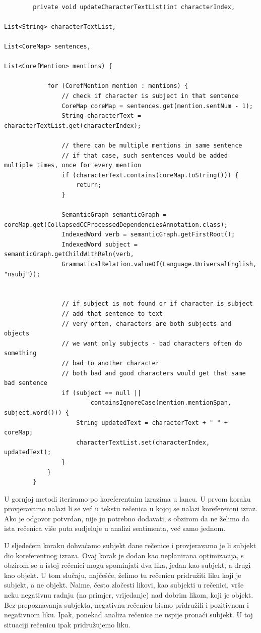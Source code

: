 \documentclass[a4paper,twoside,12pt]{memoir} %
\begin{document}
		\begin{lstlisting}

		private void updateCharacterTextList(int characterIndex,
																List<String> characterTextList,
																List<CoreMap> sentences,
																List<CorefMention> mentions) {

			for (CorefMention mention : mentions) {
				// check if character is subject in that sentence
				CoreMap coreMap = sentences.get(mention.sentNum - 1);
				String characterText = characterTextList.get(characterIndex);

				// there can be multiple mentions in same sentence
				// if that case, such sentences would be added multiple times, once for every mention
				if (characterText.contains(coreMap.toString())) {
					return;
				}

				SemanticGraph semanticGraph = coreMap.get(CollapsedCCProcessedDependenciesAnnotation.class);
				IndexedWord verb = semanticGraph.getFirstRoot();
				IndexedWord subject = semanticGraph.getChildWithReln(verb,
				GrammaticalRelation.valueOf(Language.UniversalEnglish, "nsubj"));


				// if subject is not found or if character is subject
				// add that sentence to text
				// very often, characters are both subjects and objects
				// we want only subjects - bad characters often do something
				// bad to another character
				// both bad and good characters would get that same bad sentence
				if (subject == null ||
						containsIgnoreCase(mention.mentionSpan, subject.word())) {
					String updatedText = characterText + " " + coreMap;
					characterTextList.set(characterIndex, updatedText);
				}
			}
		}
		\end{lstlisting}

		U gornjoj metodi iteriramo po koreferentnim izrazima u lancu. U prvom koraku provjeravamo nalazi li se već u tekstu rečenica u kojoj se nalazi koreferentni izraz. Ako je odgovor potvrdan, nije ju potrebno dodavati, s obzirom da ne želimo da ista rečenica više puta sudjeluje u analizi sentimenta, već samo jednom.

		U sljedećem koraku dohvaćamo subjekt dane rečenice i provjeravamo je li subjekt dio koreferentnog izraza. Ovaj korak je dodan kao neplanirana optimizacija, s obzirom se u istoj rečenici mogu spominjati dva lika, jedan kao subjekt, a drugi kao objekt. U tom slučaju, najčešće, želimo tu rečenicu pridružiti liku koji je subjekt, a ne objekt. Naime, često zločesti likovi, kao subjekti u rečenici, vrše neku negativnu radnju (na primjer, vrijeđanje) nad dobrim likom, koji je objekt. Bez prepoznavanja subjekta, negativnu rečenicu bismo pridružili i pozitivnom i negativnom liku. Ipak, ponekad analiza rečenice ne uspije pronaći subjekt. U toj situaciji rečenicu ipak pridružujemo liku.
\end{document}
